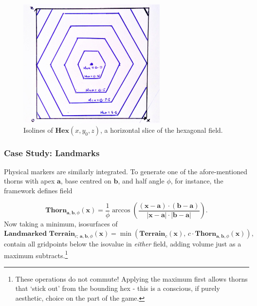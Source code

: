 \documentclass[a4paper, 11pt]{article}
\begin{document}
\begin{flushleft}

\vspace{5pt}\noindent
\begin{figure}[t]
\centering
\includegraphics[width=0.66\textwidth]{Hex Field}
\caption{Isolines of $\textbf{Hex}(x,y_0,z)$, a horizontal slice of the hexagonal field.}
\label{Hex Field}
\end{figure}

\subsubsection{Case Study: Landmarks}

Physical markers are similarly integrated. To generate one of the afore-mentioned thorns with apex $\mathbf{a}$, base centred on $\mathbf{b}$, and half angle $\phi$, for instance, the framework defines field

$$\textbf{Thorn}_{\mathbf{a},\mathbf{b},\phi}(\mathbf{x}) = \frac{1}{\phi}\arccos\left(\frac{\left(\mathbf{x}-\mathbf{a}\right)\cdot\left(\mathbf{b}-\mathbf{a}\right)}{\left|\mathbf{x}-\mathbf{a}\right|\cdot\left|\mathbf{b}-\mathbf{a}\right|}\right).$$
Now taking a minimum, isosurfaces of
$$\textbf{Landmarked Terrain}_{c;\,\mathbf{a},\mathbf{b},\phi}(\mathbf{x}) = \min\left(\textbf{Terrain}_c(\mathbf{x}), \, c\cdot\textbf{Thorn}_{\mathbf{a},\mathbf{b},\phi}(\mathbf{x})\right),$$
contain all gridpoints below the isovalue in \textit{either} field, adding volume just as a maximum subtracts.\footnote{These operations do not commute! Applying the maximum first allows thorns that `stick out' from the bounding hex - this is a conscious, if purely aesthetic, choice on the part of the game.} %



\end{flushleft}
\end{document}
